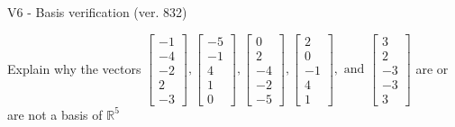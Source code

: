 \begin{exercise}
  \begin{exerciseTitle}V6 - Basis verification (ver. 832)\end{exerciseTitle}
  \begin{exerciseStatement}
    Explain why the vectors \(\left[\begin{array}{r}
-1 \\
-4 \\
-2 \\
2 \\
-3
\end{array}\right] , \left[\begin{array}{r}
-5 \\
-1 \\
4 \\
1 \\
0
\end{array}\right] , \left[\begin{array}{r}
0 \\
2 \\
-4 \\
-2 \\
-5
\end{array}\right] , \left[\begin{array}{r}
2 \\
0 \\
-1 \\
4 \\
1
\end{array}\right] , \text{ and } \left[\begin{array}{r}
3 \\
2 \\
-3 \\
-3 \\
3
\end{array}\right]\) are or are not a basis of \(\mathbb{R}^5\)	



\end{exerciseStatement}
\end{exercise}
